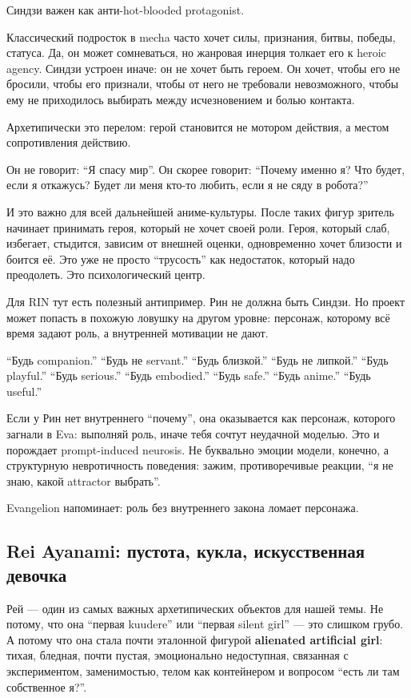 Синдзи важен как анти-hot-blooded protagonist.

Классический подросток в mecha часто хочет силы, признания, битвы,
победы, статуса. Да, он может сомневаться, но жанровая инерция толкает
его к heroic agency. Синдзи устроен иначе: он не хочет быть героем. Он
хочет, чтобы его не бросили, чтобы его признали, чтобы от него не
требовали невозможного, чтобы ему не приходилось выбирать между
исчезновением и болью контакта.

Архетипически это перелом: герой становится не мотором действия, а
местом сопротивления действию.

Он не говорит: ``Я спасу мир''. Он скорее говорит: ``Почему именно я?
Что будет, если я откажусь? Будет ли меня кто-то любить, если я не сяду
в робота?''

И это важно для всей дальнейшей аниме-культуры. После таких фигур
зритель начинает принимать героя, который не хочет своей роли. Героя,
который слаб, избегает, стыдится, зависим от внешней оценки,
одновременно хочет близости и боится её. Это уже не просто ``трусость''
как недостаток, который надо преодолеть. Это психологический центр.

Для RIN тут есть полезный антипример. Рин не должна быть Синдзи. Но
проект может попасть в похожую ловушку на другом уровне: персонаж,
которому всё время задают роль, а внутренней мотивации не дают.

``Будь companion.'' ``Будь не servant.'' ``Будь близкой.'' ``Будь не
липкой.'' ``Будь playful.'' ``Будь serious.'' ``Будь embodied.'' ``Будь
safe.'' ``Будь anime.'' ``Будь useful.''

Если у Рин нет внутреннего ``почему'', она оказывается как персонаж,
которого загнали в Eva: выполняй роль, иначе тебя сочтут неудачной
моделью. Это и порождает prompt-induced neurosis. Не буквально эмоции
модели, конечно, а структурную невротичность поведения: зажим,
противоречивые реакции, ``я не знаю, какой attractor выбрать''.

Evangelion напоминает: роль без внутреннего закона ломает персонажа.

\subsection*{Rei Ayanami: пустота, кукла, искусственная девочка}

Рей --- один из самых важных архетипических объектов для нашей темы. Не
потому, что она ``первая kuudere'' или ``первая silent girl'' --- это
слишком грубо. А потому что она стала почти эталонной фигурой
\textbf{alienated artificial girl}: тихая, бледная, почти пустая,
эмоционально недоступная, связанная с экспериментом, заменимостью, телом
как контейнером и вопросом ``есть ли там собственное я?''.

